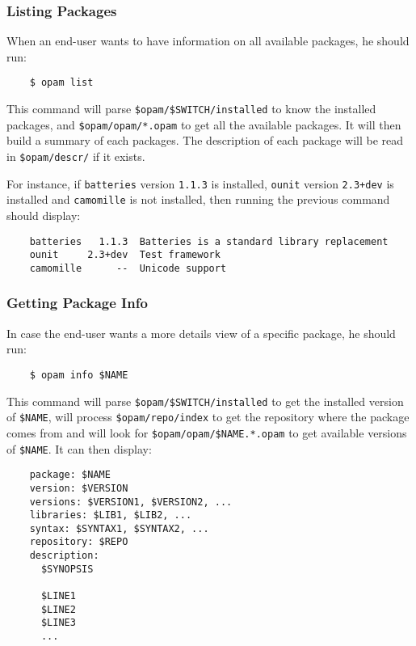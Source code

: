 \documentclass[a4paper,11pt]{article}
\begin{document}
\subsubsection{Listing Packages}
\label{opam-list}

When an end-user wants to have information on all available packages,
he should run:

\begin{verbatim}
    $ opam list
\end{verbatim}

This command will parse \verb+$opam/$SWITCH/installed+ to know the
installed packages, and \verb+$opam/opam/*.opam+ to get all the
available packages. It will then build a summary of each packages. The
description of each package will be read in \verb+$opam/descr/+ if it
exists.

For instance, if {\tt batteries} version {\tt 1.1.3} is installed,
{\tt ounit} version {\tt 2.3+dev} is installed and {\tt camomille} is
not installed, then running the previous command should display:

\begin{verbatim}
    batteries   1.1.3  Batteries is a standard library replacement
    ounit     2.3+dev  Test framework
    camomille      --  Unicode support
\end{verbatim}

\subsubsection{Getting Package Info}

In case the end-user wants a more details view of a specific package,
he should run:

\begin{verbatim}
    $ opam info $NAME
\end{verbatim}

This command will parse \verb+$opam/$SWITCH/installed+ to get the
installed version of \verb+$NAME+, will process
\verb+$opam/repo/index+ to get the repository where the package comes
from and will look for \verb+$opam/opam/$NAME.*.opam+ to get available
versions of \verb+$NAME+. It can then display:

\begin{verbatim}
    package: $NAME
    version: $VERSION
    versions: $VERSION1, $VERSION2, ...
    libraries: $LIB1, $LIB2, ...
    syntax: $SYNTAX1, $SYNTAX2, ...
    repository: $REPO
    description:
      $SYNOPSIS

      $LINE1
      $LINE2
      $LINE3
      ...
\end{verbatim}
\end{document}
